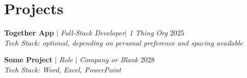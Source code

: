 \section{Projects}
\resumeSubHeadingListStart

    \resumeProjectHeading
    {\textbf{Together App} $|$ \emph{Full-Stack Developer}$|$ \emph{1 Thing Org}} {2025}   
    {\\ \vspace{2mm} \emph{\small{Tech Stack: optional, depending on personal preference and spacing available}}} \vspace{-2.5mm}
    \resumeItemListStart
    \resumeItemListEnd

    \iffalse
    \resumeProjectHeading
    {\textbf{{Some Other Project} } $|$ \emph{Role }$|$ \emph{Company or Blank}} {2029}   
    {\\ \vspace{2mm} \emph{\small{Tech Stack: Word, Excel, PowerPoint}}} \vspace{-2.5mm}
    \resumeItemListStart
        \resumeItem{Mention the duration of your projects is optional}
    \resumeItemListEnd
    \fi

    \resumeProjectHeading
    {\textbf{{Some Project} } $|$ \emph{Role }$|$ \emph{Company or Blank}} {2028}   
    {\\ \vspace{2mm} \emph{\small{Tech Stack: Word, Excel, PowerPoint}}} \vspace{-2.5mm}
    \resumeItemListStart
    \resumeItemListEnd

\resumeSubHeadingListEnd